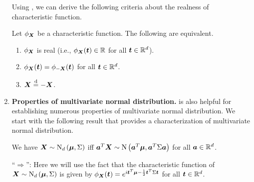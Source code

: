 \begin{enumerate}
Using , we can derive the following criteria about the
realness of characteristic function.

\begin{corollary}
\label{cor:char-fn-real-crit}
Let \(\phi_{\bm{X}}\) be a characteristic function. The following are
equivalent.
\begin{enumerate}
\item \(\phi_{\bm{X}}\) is real (i.e., \(\phi_{\bm{X}}(\bm{t})\in\mathbb{R}\) for
all \(\bm{t}\in\mathbb{R}^{d}\)).
\item \(\phi_{\bm{X}}(\bm{t})=\phi_{-\bm{X}}(\bm{t})\) for all
\(\bm{t}\in\mathbb{R}^{d}\).
\item \(\bm{X}\overset{\text{d}}= -\bm{X}\).
\end{enumerate}
\end{corollary}
\begin{pf}
\end{pf}
\item \textbf{Properties of multivariate normal
distribution.}  is also helpful for establishing
numerous properties of multivariate normal distribution. We start with the
following result that provides a characterization of multivariate normal
distribution.

\begin{proposition}
\label{prp:mult-norm-char}
We have \(\bm{X}\sim\operatorname{N}_{d}\left(\bm{\mu},\Sigma\right)\) iff
\(\bm{a}^{T}\bm{X}\sim
\operatorname{N}\left(\bm{a}^{T}\bm{\mu},\bm{a}^{T}\Sigma\bm{a}\right)\) for all
\(\bm{a}\in\mathbb{R}^{d}\).
\end{proposition}
\begin{pf}
``\(\Rightarrow\)'': Here we will use the fact that the characteristic function
of \(\bm{X}\sim\operatorname{N}_{d}\left(\bm{\mu},\Sigma\right)\) is given by
\(\phi_{\bm{X}}(\bm{t})
=e^{i\bm{t}^{T}\bm{\mu}-\frac{1}{2}\bm{t}^{T}\Sigma \bm{t}}\) for all
\(\bm{t}\in\mathbb{R}^{d}\).


\end{pf}
\end{enumerate}
